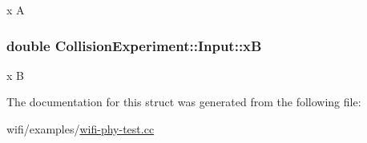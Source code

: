 x A 

\subsubsection[{\texorpdfstring{xB}{xB}}]{\setlength{\rightskip}{0pt plus 5cm}double Collision\+Experiment\+::\+Input\+::xB}\hypertarget{structCollisionExperiment_1_1Input_a077d4ed496d30c5c298c570566ea592a}{}\label{structCollisionExperiment_1_1Input_a077d4ed496d30c5c298c570566ea592a}


x B 



The documentation for this struct was generated from the following file\+:\begin{DoxyCompactItemize}
\item 
wifi/examples/\hyperlink{wifi-phy-test_8cc}{wifi-\/phy-\/test.\+cc}\end{DoxyCompactItemize}
